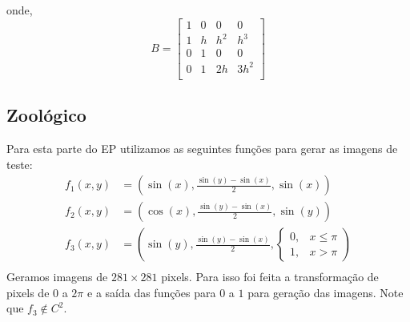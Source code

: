 \documentclass[12pt, a4paper]{article}
\begin{document}
    onde,
    \begin{equation*}
        B = \begin{bmatrix}
            1 & 0 & 0   & 0 \\
            1 & h & h^2 & h^3 \\
            0 & 1 & 0   & 0 \\
            0 & 1 & 2h  & 3h^2 \\
        \end{bmatrix}
    \end{equation*}

\subsection*{Zoológico}
    Para esta parte do EP utilizamos as seguintes funções para gerar as imagens
    de teste:
    \begin{align*}
        f_1(x,y) &= \left(\sin(x), \frac{\sin(y) - \sin(x)}{2}, \sin(x)\right)\\
        f_2(x,y) &= \left(\cos(x), \frac{\sin(y) - \sin(x)}{2}, \sin(y)\right)\\
        f_3(x,y) &= \left(\sin(y), \frac{\sin(y) - \sin(x)}{2}, \begin{cases}
            0, & x \leq \pi\\
            1, & x > \pi
        \end{cases}\right)\\
    \end{align*}
    Geramos imagens de $281\times281$ pixels. Para isso foi feita a transformação
    de pixels de $0$ a $2\pi$ e a saída das funções para $0$ a $1$ para geração
    das imagens. Note que $f_3 \notin C^2$.\\
\end{document}
